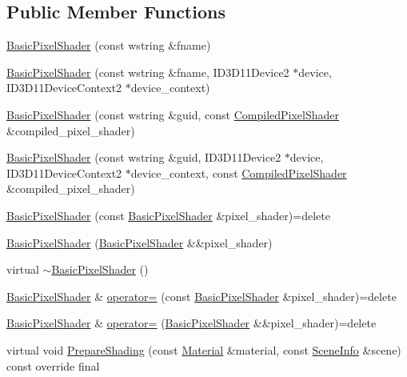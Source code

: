 \subsection*{Public Member Functions}
\begin{DoxyCompactItemize}
\item 
\hyperlink{classmage_1_1_basic_pixel_shader_ae89993e3ba1ab6461e4e984ee8c7b819}{Basic\+Pixel\+Shader} (const wstring \&fname)
\item 
\hyperlink{classmage_1_1_basic_pixel_shader_a6d4283d378d5655e25f7c20014a9663e}{Basic\+Pixel\+Shader} (const wstring \&fname, I\+D3\+D11\+Device2 $\ast$device, I\+D3\+D11\+Device\+Context2 $\ast$device\+\_\+context)
\item 
\hyperlink{classmage_1_1_basic_pixel_shader_ad7be28d3429b13d7adf6c150c173a117}{Basic\+Pixel\+Shader} (const wstring \&guid, const \hyperlink{structmage_1_1_compiled_pixel_shader}{Compiled\+Pixel\+Shader} \&compiled\+\_\+pixel\+\_\+shader)
\item 
\hyperlink{classmage_1_1_basic_pixel_shader_a931200fdba2748e374103d85a66690c5}{Basic\+Pixel\+Shader} (const wstring \&guid, I\+D3\+D11\+Device2 $\ast$device, I\+D3\+D11\+Device\+Context2 $\ast$device\+\_\+context, const \hyperlink{structmage_1_1_compiled_pixel_shader}{Compiled\+Pixel\+Shader} \&compiled\+\_\+pixel\+\_\+shader)
\item 
\hyperlink{classmage_1_1_basic_pixel_shader_ab82055206ff2a05b73f18ce23353a4bb}{Basic\+Pixel\+Shader} (const \hyperlink{classmage_1_1_basic_pixel_shader}{Basic\+Pixel\+Shader} \&pixel\+\_\+shader)=delete
\item 
\hyperlink{classmage_1_1_basic_pixel_shader_a0a5366edb694e78e4c8075fad70b7dff}{Basic\+Pixel\+Shader} (\hyperlink{classmage_1_1_basic_pixel_shader}{Basic\+Pixel\+Shader} \&\&pixel\+\_\+shader)
\item 
virtual \hyperlink{classmage_1_1_basic_pixel_shader_a7b4ac308850eb9ad55cbbd1e6389271b}{$\sim$\+Basic\+Pixel\+Shader} ()
\item 
\hyperlink{classmage_1_1_basic_pixel_shader}{Basic\+Pixel\+Shader} \& \hyperlink{classmage_1_1_basic_pixel_shader_a9656fdae2d17691d3e7dd850e7844efb}{operator=} (const \hyperlink{classmage_1_1_basic_pixel_shader}{Basic\+Pixel\+Shader} \&pixel\+\_\+shader)=delete
\item 
\hyperlink{classmage_1_1_basic_pixel_shader}{Basic\+Pixel\+Shader} \& \hyperlink{classmage_1_1_basic_pixel_shader_a5d6224f0454d1d1f9583f6b9f8ad8201}{operator=} (\hyperlink{classmage_1_1_basic_pixel_shader}{Basic\+Pixel\+Shader} \&\&pixel\+\_\+shader)=delete
\item 
virtual void \hyperlink{classmage_1_1_basic_pixel_shader_a95b6a4ed73ac8c9b31348e93f1fdf99d}{Prepare\+Shading} (const \hyperlink{structmage_1_1_material}{Material} \&material, const \hyperlink{structmage_1_1_scene_info}{Scene\+Info} \&scene) const override final
\end{DoxyCompactItemize}
